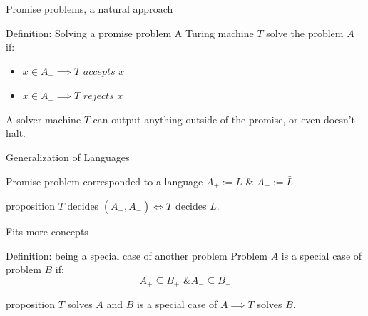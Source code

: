         \begin{frame}{Promise problems, a natural approach}
            \begin{block}{Definition: Solving a promise problem}
                A Turing machine $T$ solve the problem $A$ if:
                \begin{itemize}
                    \item $x \in A_+ \implies T$ $accepts$ $x$
                    \item $x \in A_- \implies T$ $rejects$ $x$
                \end{itemize}    
            \end{block}
            \pause
            \begin{alertblock}{}
                A solver machine $T$ can output anything outside of the promise, or even doesn't halt.
            \end{alertblock}
        \end{frame}
        
        \begin{frame}{Generalization of Languages}
            \begin{block}{Promise problem corresponded to a language}
                $A_+ := L$ \& $A_-:= \bar{L}$
            \end{block}
            \pause
            \begin{block}{proposition}
                $T$ decides $(A_+,A_-) \iff T$ decides $L$.
            \end{block}
        \end{frame}

        \begin{frame}{Fits more concepts}
            \begin{block}{Definition: being a special case of another problem}
                Problem $A$ is a special case of problem $B$ if:
                $$A_+ \subseteq B_+ \text{ \& } A_- \subseteq B_-$$
            \end{block}    
            \pause
            \begin{block}{proposition}
                $T$ solves $A$ and $B$ is a special case of $A \implies T$ solves
                $B$.
            \end{block}
        \end{frame}
        
